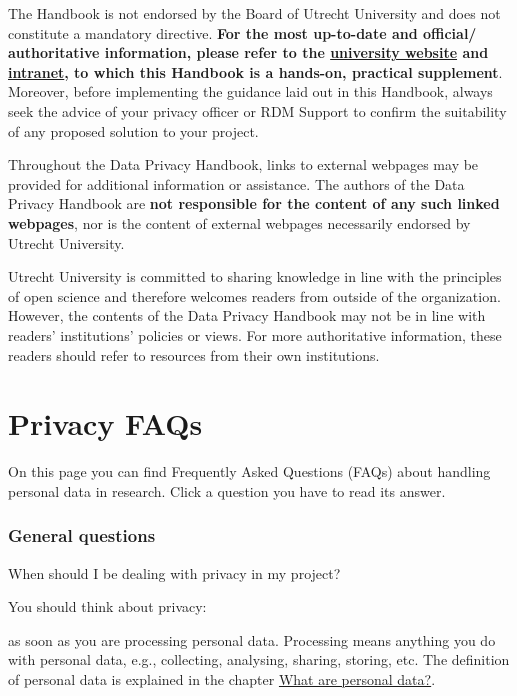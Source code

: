 \documentclass[
]{book}
\begin{document}
The Handbook is not endorsed by the Board of Utrecht University and does not
constitute a mandatory directive. \textbf{For the most up-to-date and official/
authoritative information, please refer to the
\href{https://www.uu.nl/en/research/research-data-management}{university website}
and \href{https://intranet.uu.nl/en/knowledge-base/privacy-at-uu}{intranet},
to which this Handbook is a hands-on, practical supplement}. Moreover, before
implementing the guidance laid out in this Handbook, always seek the advice of
your privacy officer or RDM Support to confirm the suitability of any proposed
solution to your project.

Throughout the Data Privacy Handbook, links to external webpages may be provided
for additional information or assistance. The authors of the Data Privacy
Handbook are \textbf{not responsible for the content of any such linked webpages}, nor
is the content of external webpages necessarily endorsed by Utrecht University.

Utrecht University is committed to sharing knowledge in line with the principles
of open science and therefore welcomes readers from outside of the organization.
However, the contents of the Data Privacy Handbook may not be in line with readers'
institutions' policies or views. For more authoritative information, these
readers should refer to resources from their own institutions.

\hypertarget{faq}{%
\chapter{Privacy FAQs}\label{faq}}

On this page you can find Frequently Asked Questions (FAQs) about handling
personal data in research. Click a question you have to read its answer.

\hypertarget{general}{%
\subsection{General questions}\label{general}}

When should I be dealing with privacy in my project?

You should think about privacy:

as soon as you are processing personal data. Processing means anything you do with personal data, e.g., collecting, analysing, sharing, storing, etc. The definition of personal data is explained in the chapter \protect\hyperlink{personal-data}{What are personal data?}.
\end{document}
